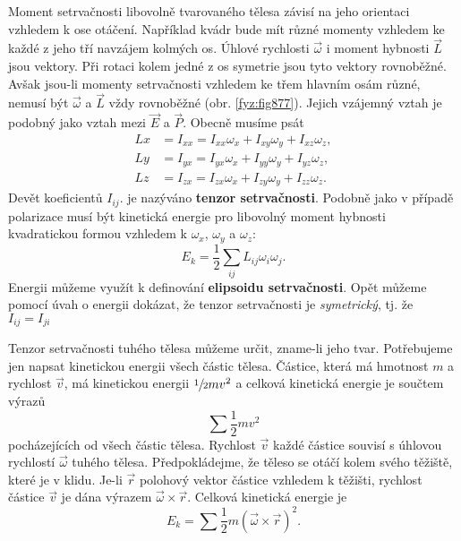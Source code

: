     Moment setrvačnosti libovolně tvarovaného tělesa závisí na jeho orientaci vzhledem k ose
    otáčení. Například kvádr bude mít různé momenty vzhledem ke každé z jeho tří navzájem kolmých
    os. Úhlové rychlosti \(\vec{ω}\) i moment hybnosti \(\vec{L}\) jsou vektory. Při rotaci kolem
    jedné z os symetrie jsou tyto vektory rovnoběžné. Avšak jsou-li momenty setrvačnosti vzhledem ke
    třem hlavním osám různé, nemusí být \(\vec{ω}\) a \(\vec{L}\) vždy rovnoběžné (obr.
    \ref{fyz:fig877}). Jejich vzájemný vztah je podobný jako vztah mezi \(\vec{E}\) a \(\vec{P}\).
    Obecně musíme psát
    \begin{align}
      Lx&=I_{xx}=I_{xx}ω_x+I_{xy}ω_y+I_{xz}ω_z,  \nonumber         \\
      Ly&=I_{yx}=I_{yx}ω_x+I_{yy}ω_y+I_{yz}ω_z,  \label{fyz:eq839} \\
      Lz&=I_{zx}=I_{zx}ω_x+I_{zy}ω_y+I_{zz}ω_z.  \nonumber 
    \end{align}
    Devět koeficientů \(I_{ij}\). je nazýváno \textbf{tenzor setrvačnosti}. Podobně jako v případě
    polarizace musí být kinetická energie pro libovolný moment hybnosti kvadratickou formou vzhledem
    k \(ω_x\), \(ω_y\) a \(ω_z\):
    \begin{equation}\label{fyz:eq840}
      E_k = \frac{1}{2}\sum_{ij}L_{ij}ω_iω_j.
    \end{equation}
    Energii můžeme využít k definování \textbf{elipsoidu setrvačnosti}. Opět můžeme pomocí úvah o
    energii dokázat, že tenzor setrvačnosti je \emph{symetrický}, tj. že \(I_{ij} = I_{ji}\)

    Tenzor setrvačnosti tuhého tělesa můžeme určit, zname-li jeho tvar. Potřebujeme jen napsat
    kinetickou energii všech částic tělesa. Částice, která má hmotnost \(m\) a rychlost \(\vec{v}\),
    má kinetickou energii \(\sfrac{1}{2}mv^2\) a celková kinetická energie je součtem výrazů
    \[\sum\frac{1}{2}mv^2\] pocházejících od všech částic tělesa. Rychlost \(\vec{v}\) každé částice
    souvisí s úhlovou rychlostí \(\vec{ω}\) tuhého tělesa. Předpokládejme, že těleso se otáčí kolem
    svého těžiště, které je v klidu. Je-li \(\vec{r}\) polohový vektor částice vzhledem k těžišti,
    rychlost částice \(\vec{v}\) je dána výrazem \(\vec{ω}\times\vec{r}\). Celková kinetická energie
    je
    \begin{equation}\label{fyz:eq841}
      E_k = \sum\frac{1}{2}m\left(\vec{ω}\times\vec{r}\right)^2.
    \end{equation}

    
